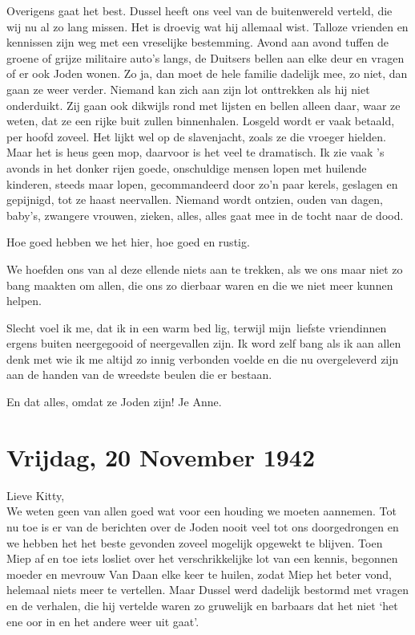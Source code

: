 \documentclass{book}
\begin{document}
Overigens gaat het best. Dussel heeft ons veel van de buitenwereld verteld, die
wij nu al zo lang missen. Het is droevig wat hij allemaal wist. Talloze vrienden
en kennissen zijn weg met een vreselijke bestemming. Avond aan avond tuffen de
groene of grijze militaire auto's langs, de Duitsers bellen aan elke deur en
vragen of er ook Joden wonen.  Zo ja, dan moet de hele familie dadelijk mee, zo
niet, dan gaan ze weer verder. Niemand kan zich aan zijn lot onttrekken als hij
niet onderduikt. Zij gaan ook dikwijls rond met lijsten en bellen alleen daar,
waar ze weten, dat ze een rijke buit zullen binnenhalen. Losgeld wordt er vaak
betaald, per hoofd zoveel. Het lijkt wel op de slavenjacht, zoals ze die vroeger
hielden. Maar het is heus geen mop, daarvoor is het veel te dramatisch. Ik zie
vaak 's avonds in het donker rijen goede, onschuldige mensen lopen met huilende
kinderen, steeds maar lopen, gecommandeerd door zo'n paar kerels, geslagen en
gepijnigd, tot ze haast neervallen. Niemand wordt ontzien, ouden van dagen,
baby's, zwangere vrouwen, zieken, alles, alles gaat mee in de tocht naar de
dood.

Hoe goed hebben we het hier, hoe goed en rustig.

We hoefden ons van al deze ellende niets aan te trekken, als we ons maar niet zo
bang maakten om allen, die ons zo dierbaar waren en die we niet meer kunnen
helpen.

Slecht voel ik me, dat ik in een warm bed lig, terwijl mijn~liefste vriendinnen
ergens buiten neergegooid of neergevallen zijn. Ik word zelf bang als ik aan
allen denk met wie ik me altijd zo innig verbonden voelde en die nu overgeleverd
zijn aan de handen van de wreedste beulen die er bestaan.

En dat alles, omdat ze Joden zijn! Je Anne.

\section*{Vrijdag, 20 November 1942}

Lieve Kitty,\\
We weten geen van allen goed wat voor een houding we moeten
aannemen. Tot nu toe is er van de berichten over de Joden nooit veel tot ons
doorgedrongen en we hebben het het beste gevonden zoveel mogelijk opgewekt te
blijven. Toen Miep af en toe iets losliet over het verschrikkelijke lot van een
kennis, begonnen moeder en mevrouw Van Daan elke keer te huilen, zodat Miep het
beter vond, helemaal niets meer te vertellen. Maar Dussel werd dadelijk bestormd
met vragen en de verhalen, die hij vertelde waren zo gruwelijk en barbaars dat
het niet `het ene oor in en het andere weer uit gaat'.
\end{document}
